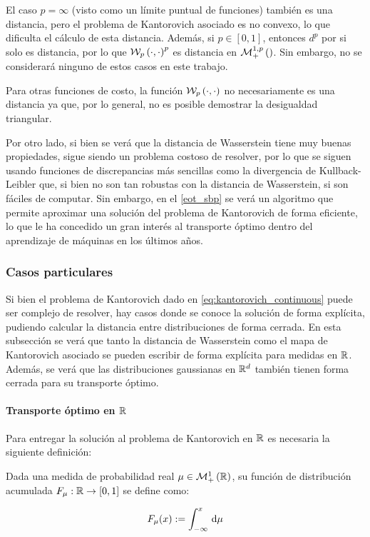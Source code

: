 El caso $p=\infty$ (visto como un límite puntual de funciones) también es una distancia, pero el problema de Kantorovich asociado es no convexo, lo que dificulta el cálculo de esta distancia. Además, si $p\in[0,1]$, entonces $d^p$ por si solo es distancia, por lo que $\mathcal{W}_{p}\left(\cdot,\cdot\right)^p$ es distancia en $\mathcal{M}_+^{1,p}\left(\right)$. Sin embargo, no se considerará ninguno de estos casos en este trabajo.

Para otras funciones de costo, la función $\mathcal{W}_{p}\left(\cdot,\cdot\right)$ no necesariamente es una distancia ya que, por lo general, no es posible demostrar la desigualdad triangular.

Por otro lado, si bien se verá que la distancia de Wasserstein tiene muy buenas propiedades, sigue siendo un problema costoso de resolver, por lo que se siguen usando funciones de discrepancias más sencillas como la divergencia de Kullback-Leibler que, si bien no son tan robustas con la distancia de Wasserstein, si son fáciles de computar. Sin embargo, en el \autoref{eot_sbp} se verá un algoritmo que permite aproximar una solución del problema de Kantorovich de forma eficiente, lo que le ha concedido un gran interés al transporte óptimo dentro del aprendizaje de máquinas en los últimos años.

\subsubsection{Casos particulares}

Si bien el problema de Kantorovich dado en \eqref{eq:kantorovich_continuous} puede ser complejo de resolver, hay casos donde se conoce la solución de forma explícita, pudiendo calcular la distancia entre distribuciones de forma cerrada. En esta subsección se verá que tanto la distancia de Wasserstein como el mapa de Kantorovich asociado se pueden escribir de forma explícita para medidas en $\mathbb{R}$. Además, se verá que las distribuciones gaussianas en $\mathbb{R}^d$ también tienen forma cerrada para su transporte óptimo.

\paragraph{Transporte óptimo en \texorpdfstring{$\mathbb{R}$}{R}}

Para entregar la solución al problema de Kantorovich en $\mathbb{R}$ es necesaria la siguiente definición:

\begin{defn}

	Dada una medida de probabilidad real $\mu\in\mathcal{M}_+^1\left(\mathbb{R}\right)$, su función de distribución acumulada $F_\mu:\mathbb{R}\to[0,1]$ se define como:

	\begin{equation}
		F_\mu(x) := \int_{-\infty}^x \,\operatorname{d}\!\mu
	\end{equation}

\end{defn}

